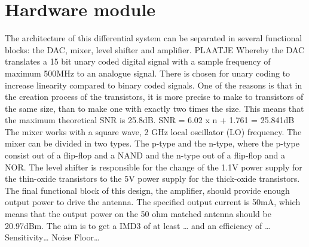 \section{Hardware module}\label{sec:overview}
The architecture of this differential system can be separated in several functional blocks: the DAC, mixer, level shifter and amplifier.
PLAATJE
Whereby the DAC translates a 15 bit unary coded digital signal with a sample frequency of maximum 500MHz to an analogue signal. There is chosen for unary coding to increase linearity compared to binary coded signals. One of the reasons is that in the creation process of the transistors, it is more precise to make to transistors of the same size, than to make one with exactly two times the size. This means that the maximum theoretical SNR is 25.8dB.
SNR = 6.02 x n + 1.761 = 25.841dB 
The mixer works with a square wave, 2 GHz local oscillator (LO) frequency. The mixer can be divided in two types. The p-type and the n-type, where the p-type consist out of a flip-flop and a NAND and the n-type out of a flip-flop and a NOR.
The level shifter is responsible for the change of the 1.1V power supply for the thin-oxide transistors to the 5V power supply for the thick-oxide transistors.
The final functional block of this design, the amplifier, should provide enough output power to drive the antenna. The specified output current is 50mA, which means that the output power on the 50 ohm matched antenna should be 20.97dBm.
The aim is to get a IMD3 of at least … and an efficiency of … 
Sensitivity…
Noise Floor…
